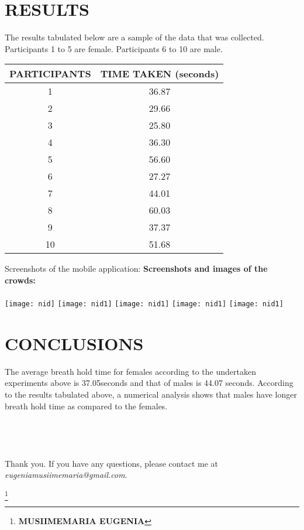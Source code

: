 \documentclass[12pt, letterpaper]{article}
\begin{document}
\clearpage
\section{\textbf{RESULTS} } 
The results tabulated below are a sample of the data that was collected. Participants 1 to 5 are female. Participants 6 to 10 are male.
\begin{table}[ht]
 
\begin{tabular}{|c | c | }

\hline                        
PARTICIPANTS  & TIME TAKEN  (seconds) \\ [0.5ex]
\hline
1 & 36.87 \\
2 & 29.66 \\
3 & 25.80 \\
4 & 36.30 \\
5 & 56.60 \\  
6 & 27.27 \\
7 & 44.01 \\
8 & 60.03 \\
9 & 37.37 \\
10 & 51.68 \\  [1ex]
\hline
\end{tabular}
\end{table}

Screenshots of the mobile application:
\clearpage
\textbf{Screenshots and images of the crowds:}\\ \\ 
\texttt{[image: nid]}
\texttt{[image: nid1]}
\texttt{[image: nid1]}
\texttt{[image: nid1]}
\texttt{[image: nid1]}

\section{\textbf{CONCLUSIONS} } 
The average breath hold time for females according to the undertaken experiments above is 37.05seconds and that of males is 44.07 seconds. According to the results tabulated above, a numerical analysis shows that males have  longer breath hold time as compared to the females.\\ \\ \\ \\ \\



Thank you. If you have any questions, please contact me at \emph{eugeniamusiimemaria@gmail.com}.

\footnote{\textbf{ MUSIIMEMARIA EUGENIA}}
\end{document}
